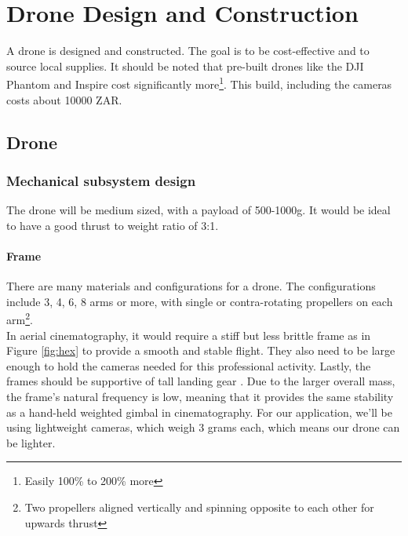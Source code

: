 \chapter{Drone Design and Construction}

A drone is designed and constructed. The goal is to be cost-effective and to source local supplies. It should be noted that pre-built drones like the DJI Phantom and Inspire cost significantly more\footnote{Easily 100\% to 200\% more}. This build, including the cameras costs about 10000 ZAR.

\section{Drone}

\subsection{Mechanical subsystem design}

The drone will be medium sized, with a payload of 500-1000g. It would be ideal to have a good thrust to weight ratio of 3:1.

\subsubsection{Frame}

There are many materials and configurations for a drone. The configurations include 3, 4, 6, 8 arms or more, with single or contra-rotating propellers on each arm\footnote{Two propellers aligned vertically and spinning opposite to each other for upwards thrust}. \\

In aerial cinematography, it would require a stiff but less brittle frame as in Figure \ref{fig:hex} to provide a smooth and stable flight. They also need to be large enough to hold the cameras needed for this professional activity. Lastly, the frames should be supportive of tall landing gear \cite{frame}. Due to the larger overall mass, the frame's natural frequency is low, meaning that it provides the same stability as a hand-held weighted gimbal in cinematography. For our application, we'll be using lightweight cameras, which weigh 3 grams each, which means our drone can be lighter.\\

